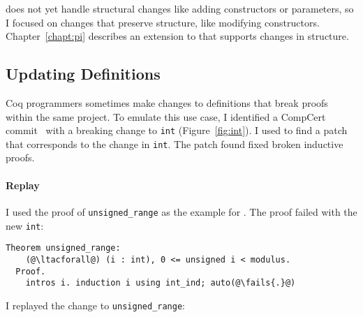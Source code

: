 \sysname does not yet handle structural changes like adding constructors or parameters, 
so I focused on changes that preserve structure, like modifying constructors.
Chapter~\ref{chapt:pi} describes an extension to \sysnamelong that supports changes in structure.

\begin{figure*}
\begin{minipage}{0.49\textwidth}
\lstset{language=coq, aboveskip=0pt,belowskip=0pt}



\end{minipage}
\hfill
\begin{minipage}{0.49\textwidth}
\lstset{language=coq, aboveskip=0pt,belowskip=0pt}



\end{minipage}
\caption[Caption for LOF]{Old (left) and new (right) definitions of \lstinline{int} in CompCert.}
\label{fig:int}
\end{figure*}

\subsection{Updating Definitions}
\label{sec:compcert}

Coq programmers sometimes make changes to definitions that break proofs
within the same project. To emulate this use case, 
I identified a CompCert commit~\cite{compcertcommit}
with a breaking change to \lstinline{int} (Figure~\ref{fig:int}). %
I used \sysname to find a patch that corresponds to the change in \lstinline{int}.
The patch \sysname found fixed broken inductive proofs.

\paragraph{Replay} I used the proof of \lstinline{unsigned_range} as the example for \sysname.
The proof failed with the new \lstinline{int}:

\lstset{language=coq, aboveskip=3pt,belowskip=3pt}
\begin{lstlisting}[language=coq]
  Theorem unsigned_range:
    (@\ltacforall@) (i : int), 0 <= unsigned i < modulus.
  Proof.
    intros i. induction i using int_ind; auto(@\fails{.}@)
\end{lstlisting}
I replayed the change to \lstinline{unsigned_range}:

